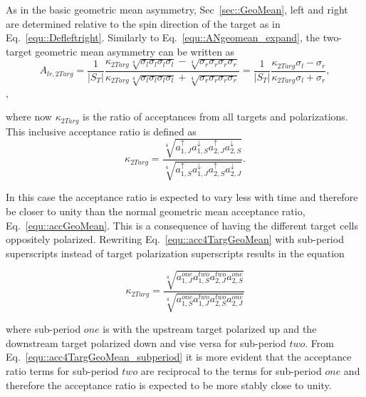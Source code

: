 As in the basic geometric mean asymmetry, Sec~\ref{sec::GeoMean}, left and right
are determined relative to the spin direction of the target as in
Eq.~\ref{equ::Defleftright}.  Similarly to Eq.~\ref{equ::ANgeomean_expand}, the
two-target geometric mean asymmetry can be written as
\begin{equation}
  A_{lr,2Targ}= \frac{1}{|S_T|}
  \frac{
    \kappa_{2Targ} \sqrt[4]{\sigma_l\sigma_l\sigma_l\sigma_l} -
    \sqrt[4]{\sigma_r\sigma_r\sigma_r\sigma_r}
  }{
    \kappa_{2Targ} \sqrt[4]{\sigma_l\sigma_l\sigma_l\sigma_l} +
    \sqrt[4]{\sigma_r\sigma_r\sigma_r\sigma_r}
  }
  =
  \frac{1}{|S_T|}
  \frac{\kappa_{2Targ}\sigma_l - \sigma_r}{
    \kappa_{2Targ}\sigma_l + \sigma_r},
\end{equation},

\noindent
where now $\kappa_{2Targ}$ is the ratio of acceptances from all targets and
polarizations.  This inclusive acceptance ratio is defined as
\begin{equation}
  \label{equ::acc4TargGeoMean}
  \kappa_{2Targ} =
  \frac{
    \sqrt[4]{
      a^\uparrow_{1,J}
      a^\downarrow_{1,S}
      a^\uparrow_{2,J}
      a^\downarrow_{2,S}}
  }{
    \sqrt[4]{
      a^\uparrow_{1,S}
      a^\downarrow_{1,J}
      a^\uparrow_{2,S}
      a^\downarrow_{2,J}}
  }.
\end{equation}

\noindent
In this case the acceptance ratio is expected to vary less with time and
therefore be closer to unity than the normal geometric mean acceptance ratio,
Eq.~\ref{equ::accGeoMean}.  This is a consequence of having the different target
cells oppositely polarized.  Rewriting Eq.~\ref{equ::acc4TargGeoMean} with
sub-period superscripts instead of target polarization superscripts results in
the equation

\begin{equation}
  \label{equ::acc4TargGeoMean_subperiod}
  \kappa_{2Targ} =
  \frac{ \sqrt[4]{ a^{one}_{1,J} a^{two}_{1,S} a^{two}_{2,J} a^{one}_{2,S} }
  }{
    \sqrt[4]{ a^{one}_{1,S} a^{two}_{1,J} a^{two}_{2,S} a^{one}_{2,J} }
  }
\end{equation}

\noindent
where sub-period $one$ is with the upstream target polarized up and the
downstream target polarized down and vise versa for sub-period $two$.  From
Eq.~\ref{equ::acc4TargGeoMean_subperiod} it is more evident that the acceptance
ratio terms for sub-period $two$ are reciprocal to the terms for sub-period
$one$ and therefore the acceptance ratio is expected to be more stably close to
unity.

